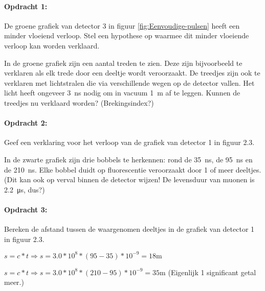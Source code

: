 \begin{minipage}[t]{1\columnwidth}%

\paragraph{Opdracht 1:}

De groene grafiek van detector 3 in figuur \ref{fig:Eenvoudige-pulsen}
heeft een minder vloeiend verloop. Stel een hypothese op waarmee dit
minder vloeiende verloop kan worden verklaard.

In de groene grafiek zijn een aantal treden te zien. Deze zijn
bijvoorbeeld te verklaren als elk trede door een deeltje wordt
veroorzaakt. De treedjes zijn ook te verklaren met lichtstralen die via
verschillende wegen op de detector vallen. Het licht heeft ongeveer
\SI{3}{\nano\second} nodig om in vacuum \SI{1}{\meter} af te leggen.
Kunnen de treedjes nu verklaard worden? (Brekingsindex?)

\end{minipage}

\begin{minipage}[t]{1\columnwidth}%

\paragraph{Opdracht 2:}

Geef een verklaring voor het verloop van de grafiek van detector
1 in figuur 2.3.

In de zwarte grafiek zijn drie bobbels te herkennen: rond de
\SI{35}{\nano\second}, de \SI{95}{\nano\second} en de
\SI{210}{\nano\second}. Elke bobbel duidt op fluorescentie veroorzaakt
door 1 of meer deeltjes. (Dit kan ook op verval binnen de detector
wijzen! De levensduur van muonen is \SI{2.2}{\micro\second}, dus?)

\end{minipage}

\begin{minipage}[t]{1\columnwidth}

\paragraph{Opdracht 3:}

Bereken de afstand tussen de waargenomen deeltjes in de grafiek
van detector 1 in figuur 2.3.

$s=c*t\Rightarrow s=3.0*10^{8}*\left(95-35\right)*10^{-9}=18\mathrm{m}$

$s=c*t\Rightarrow s=3.0*10^{8}*\left(210-95\right)*10^{-9}=35\mathrm{m}$
(Eigenlijk 1 significant getal meer.)
\end{minipage}


